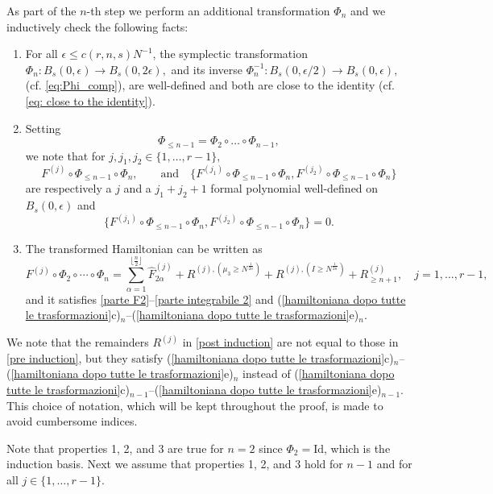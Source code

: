 \documentclass[a4paper,10pt,reqno]{article}
\theoremstyle{definition}
\theoremstyle{plain}
\theoremstyle{plain}
\theoremstyle{definition}
\theoremstyle{plain}
\theoremstyle{plain}
\theoremstyle{plain}
\theoremstyle{definition}
\theoremstyle{definition}
\begin{document}
As part of the $n$-th step we perform an additional transformation $\Phi_n$ and we inductively check the following facts:
\begin{enumerate}
    \item For all $\epsilon \le c(r,n,s) N^{-1}$, the symplectic transformation
    $
    \Phi_n : B_s(0,\epsilon) \rightarrow B_s(0,2\epsilon),
    $
    and its inverse 
    $
    \Phi_n^{-1} : B_s(0,\epsilon/2) \rightarrow B_s(0,\epsilon),
    $
    (cf. \eqref{eq:Phi_comp}), are well-defined and both are close to the identity (cf. \eqref{eq: close to the identity}).
    \item Setting
    \[
    \Phi_{\le n-1} = \Phi_2 \circ \ldots \circ \Phi_{n-1},
    \]
    we note that for $j,j_1,j_2 \in \{ 1,\ldots,r-1 \},$
    \[
    F^{(j)} \circ \Phi_{\le n-1} \circ \Phi_{n}, \qquad \text{and} \quad \{ F^{(j_1)} \circ \Phi_{\le n-1} \circ \Phi_{n} , F^{(j_2)} \circ \Phi_{\le n-1} \circ \Phi_{n} \}
    \]
    are respectively a $j$ and a $j_1+j_2+1$ formal polynomial well-defined on $B_s(0,\epsilon)$ and
    \[
    \{ F^{(j_1)} \circ \Phi_{\le n-1} \circ \Phi_{n} , F^{(j_2)} \circ \Phi_{\le n-1} \circ \Phi_{n} \} = 0.
    \]
    \item The transformed Hamiltonian can be written as
    \begin{equation}\label{post induction}
F^{(j)} \circ \Phi_2\circ\cdots\circ \Phi_{n}= \sum_{\alpha = 1}^{\lfloor \frac{n}{2} \rfloor } \widehat{F}_{2\alpha}^{(j)} + R^{(j),(\mu_3 \ge N^{\frac{1}{2n}})} + R^{(j),(I \ge N^{\frac{1}{2n}})} + R_{\ge n+1}^{(j)} ,\quad j=1,\ldots, r-1,
\end{equation}
and it satisfies \ref{parte F2}--\ref{parte integrabile 2} and (\ref{hamiltoniana dopo tutte le trasformazioni}c)$_n$--(\ref{hamiltoniana dopo tutte le trasformazioni}e)$_n$.
\end{enumerate}

We note that the remainders $R^{(j)}$ in \eqref{post induction} are not equal to those in \eqref{pre induction}, but they satisfy (\ref{hamiltoniana dopo tutte le trasformazioni}c)$_n$--(\ref{hamiltoniana dopo tutte le trasformazioni}e)$_n$ instead of (\ref{hamiltoniana dopo tutte le trasformazioni}c)$_{n-1}$--(\ref{hamiltoniana dopo tutte le trasformazioni}e)$_{n-1}$. This choice of notation, which will be kept throughout the proof, is made to avoid cumbersome indices.

Note that properties 1, 2, and 3 are true for $n=2$ since $\Phi_2 = \mbox{Id}$, which is the induction basis. Next we assume that properties 1, 2, and 3 hold for $n-1$ and for all $j \in \{ 1, \ldots , r-1 \}.$ 
\end{document}
